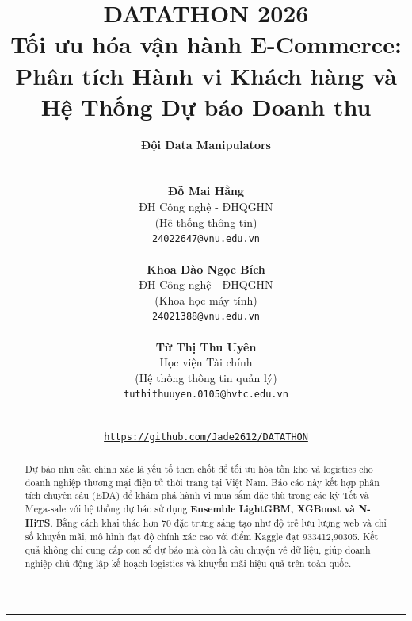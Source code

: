 \documentclass{article}
\title{
    \huge \textcolor{gridgreen}{\textbf{DATATHON 2026}} \\
    \vspace{4pt}
    \Large {Tối ưu hóa vận hành E-Commerce: \\Phân tích Hành vi Khách hàng và Hệ Thống Dự báo Doanh thu} \\
}
\author{
  \textbf{Đội Data Manipulators} \\
  \vspace{8pt} \\
  \begin{minipage}[t]{0.31\textwidth}
    \centering
    \small \textbf{Đỗ Mai Hằng} \\
    \scriptsize ĐH Công nghệ - ĐHQGHN \\ 
    \scriptsize (Hệ thống thông tin) \\
    \texttt{24022647@vnu.edu.vn} \\
  \end{minipage}
  \hfill
  \begin{minipage}[t]{0.31\textwidth}
    \centering
    \small \textbf{Khoa Đào Ngọc Bích} \\
    \scriptsize ĐH Công nghệ - ĐHQGHN \\ 
    \scriptsize (Khoa học máy tính) \\
    \texttt{24021388@vnu.edu.vn} \\
  \end{minipage}
  \hfill
  \begin{minipage}[t]{0.31\textwidth}
    \centering
    \small \textbf{Từ Thị Thu Uyên} \\
    \scriptsize Học viện Tài chính \\ 
    \scriptsize (Hệ thống thông tin quản lý) \\
    \texttt{tuthithuuyen.0105@hvtc.edu.vn} \\
  \end{minipage}
  \and
  \vspace{8pt} \\
  \small\texttt{\url{https://github.com/Jade2612/DATATHON}}
}
\begin{document}
\maketitle

\begin{abstract}
\small
Dự báo nhu cầu chính xác là yếu tố then chốt để tối ưu hóa tồn kho và logistics cho doanh nghiệp thương mại điện tử thời trang tại Việt Nam. Báo cáo này kết hợp phân tích chuyên sâu (EDA) để khám phá hành vi mua sắm đặc thù trong các kỳ Tết và Mega-sale với hệ thống dự báo sử dụng \textbf{Ensemble LightGBM, XGBoost và N-HiTS}. Bằng cách khai thác hơn 70 đặc trưng sáng tạo như độ trễ lưu lượng web và chỉ số khuyến mãi, mô hình đạt độ chính xác cao với điểm Kaggle đạt 933412,90305. Kết quả không chỉ cung cấp con số dự báo mà còn là câu chuyện về dữ liệu, giúp doanh nghiệp chủ động lập kế hoạch logistics và khuyến mãi hiệu quả trên toàn quốc.
\end{abstract}

\vspace{5pt}
\hrule
\vspace{12pt}
\end{document}
